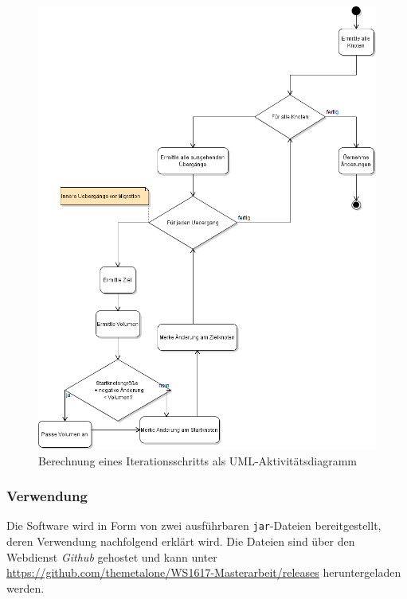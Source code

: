 \begin{figure}
\includegraphics[width=\textwidth]{res/diagramme/Berechnung.png}
\caption{Berechnung eines Iterationsschritts als UML-Aktivitätsdiagramm}\label{fig:ssec:sw:activity}
\end{figure}
\subsubsection*{Verwendung}
Die Software wird in Form von zwei ausführbaren \texttt{jar}-Dateien bereitgestellt, deren Verwendung nachfolgend erklärt wird. Die Dateien sind über den Webdienst \emph{Github} gehostet und kann unter \url{https://github.com/themetalone/WS1617-Masterarbeit/releases} heruntergeladen werden. 


